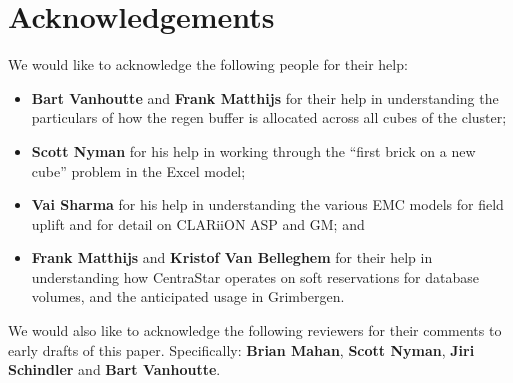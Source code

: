 \section{Acknowledgements}\label{acknowledgements-1}

We would like to acknowledge the following people for their help:

\begin{itemize}
\tightlist
\item
  \textbf{Bart Vanhoutte} and \textbf{Frank Matthijs} for their help in understanding the particulars of how the regen buffer is allocated across all cubes of the cluster;
\item
  \textbf{Scott Nyman} for his help in working through the ``first brick on a new cube'' problem in the Excel model;
\item
  \textbf{Vai Sharma} for his help in understanding the various EMC models for field uplift and for detail on CLARiiON ASP and GM; and
\item
  \textbf{Frank Matthijs} and \textbf{Kristof Van Belleghem} for their help in understanding how CentraStar operates on soft reservations for database volumes, and the anticipated usage in Grimbergen.
\end{itemize}

We would also like to acknowledge the following reviewers for their comments to early drafts of this paper. Specifically: \textbf{Brian Mahan}, \textbf{Scott Nyman}, \textbf{Jiri Schindler} and \textbf{Bart Vanhoutte}.
